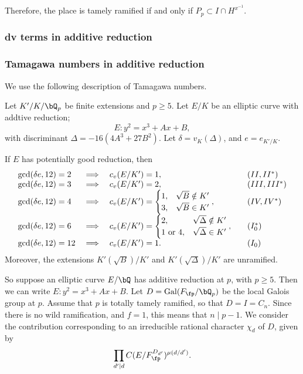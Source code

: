 Therefore, the place is tamely ramified if and only if $P_p \subset I \cap H^{x^{-1}}$. 


\subsubsection*{dv terms in additive reduction}


\subsubsection*{Tamagawa numbers in additive reduction}

We use the following description of Tamagawa numbers. %

\begin{lemma}
    Let $K' /K / \bQ_p$ be finite extensions and $p \geq 5$. Let $E / K$ be an elliptic curve with addtive reduction; 
    \[ E \colon y^2 = x^3 + Ax + B, \]
    with discriminant $\Delta = -16(4 A^3 + 27 B^2)$. Let $\delta = v_K(\Delta)$, and $e = e_{K' / K}$.

    If $E$ has potentially good reduction, then 
        \[
        \begin{array}{l l l l}
            \gcd(\delta e, 12) = 2 & \implies & c_v(E / K') = 1, & \quad (II, II^*) \\
            \gcd(\delta e, 12) = 3 & \implies & c_v(E / K') = 2, & \quad (III, III^*) \\
            \gcd(\delta e, 12) = 4 & \implies & c_v(E / K') = \begin{cases} 1, & \sqrt{B} \notin K'
                                \\ 3, & \sqrt{B} \in K' \end{cases}, & \quad (IV, IV^*) \\
            \gcd(\delta e, 12) = 6 & \implies & c_v(E / K') = \begin{cases} 2, & \sqrt{\Delta} \notin K'
                \\ 1 \ \text{or} \ 4, & \sqrt{\Delta} \in K' \end{cases}, & \quad (I_0^*) \\
            \gcd(\delta e, 12) = 12 & \implies & c_v(E / K') = 1. & \quad (I_0)
        \end{array}
        \]
    Moreover, the extensions $K'(\sqrt{B}) / K'$ and $K'(\sqrt{\Delta}) / K'$ are unramified.
\end{lemma}

So suppose an elliptic curve $E / \bQ$ has additive reduction at $p$, with $p \geq 5$. Then we can write $E \colon y^2 = x^3 + Ax + B$. Let $D = \Gal(F_{\fp} / \bQ_p)$ be the local Galois group at $p$. Assume that $p$ is totally tamely ramified, so that $D = I = C_n$. Since there is no wild ramification, and $f = 1$, this means that $n \mid p - 1$. We consider the contribution corresponding to an irreducible rational character $\chi_d$ of $D$, given by 
\begin{equation}\label{tam-contrib}
\prod_{d ' \mid d} C(E / F_{\fp}^{D_{d'}})^{\mu(d / d')}.
\end{equation}

